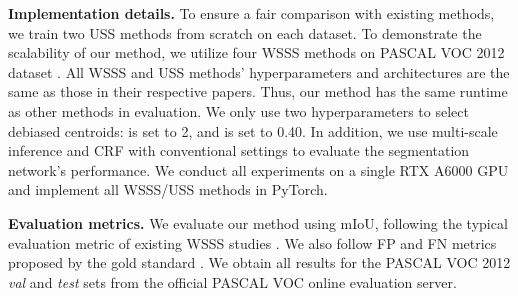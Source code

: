 \documentclass[10pt,twocolumn,letterpaper]{article}
\begin{document}
\textbf{Implementation details.} To ensure a fair comparison with existing methods, we train two USS methods \cite{liu2022adaptive, lee2022weakly} from scratch on each dataset. To demonstrate the scalability of our method, we utilize four WSSS methods \cite{ahn2019weakly, wang2020self, lee2021anti, jo2022recurseed} on PASCAL VOC 2012 dataset \cite{everingham2010pascal}. All WSSS and USS methods' hyperparameters and architectures are the same as those in their respective papers. Thus, our method has the same runtime as other methods in evaluation. We only use two hyperparameters to select debiased centroids:  is set to 2, and  is set to 0.40. In addition, we use multi-scale inference and CRF \cite{krahenbuhl2011efficient} with conventional settings to evaluate the segmentation network's performance. We conduct all experiments on a single RTX A6000 GPU and implement all WSSS/USS methods in PyTorch.



\textbf{Evaluation metrics.} We evaluate our method using mIoU, following the typical evaluation metric of existing WSSS studies \cite{ahn2018learning, ahn2019weakly, wang2020self, lee2021anti, jo2022recurseed}. We also follow FP and FN metrics proposed by the gold standard \cite{wang2020self}. We obtain all results for the PASCAL VOC 2012 \emph{val} and \emph{test} sets from the official PASCAL VOC online evaluation server.
\end{document}
